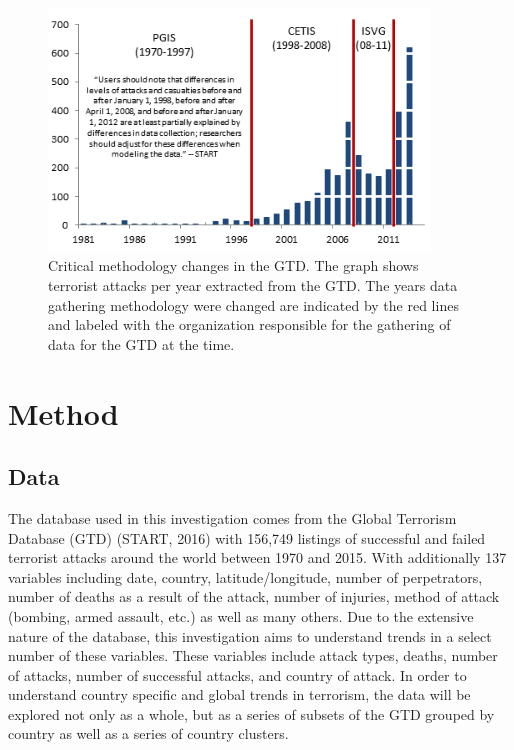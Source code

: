 \documentclass[10pt,a4paper]{article}
\begin{document}
\begin{center}
\begin{figure}[h!]
\includegraphics[width=0.9\textwidth]{backgroundpic2.png}
\caption{Critical methodology changes in the GTD. 
The graph shows terrorist attacks per year extracted from the GTD. The years data gathering methodology were changed are indicated by the red lines and labeled with  the organization responsible for the gathering of data for the GTD at the time.
}
\end{figure}
\end{center}



\newpage



\section{Method}
\subsection{Data}
The database used in this investigation comes from the Global Terrorism Database (GTD) (START, 2016) with 156,749 listings of successful and failed terrorist attacks around the world between 1970 and 2015. With additionally 137 variables including date, country, latitude/longitude, number of perpetrators, number of deaths as a result of the attack, number of injuries, method of attack (bombing, armed assault, etc.) as well as many others. Due to the extensive nature of the database, this investigation aims to understand trends in a select number of these variables. These variables include attack types, deaths, number of attacks, number of successful attacks, and country of attack. In order to understand country specific and global trends in terrorism, the data will be explored not only as a whole, but as a series of subsets of the GTD grouped by country as well as a series of country clusters.
\\\\
\end{document}
